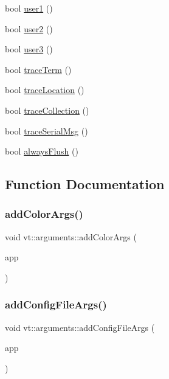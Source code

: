 \begin{DoxyCompactItemize}
$$\item 
bool \hyperlink{namespacevt_1_1arguments_afe229ddf0b473e54fac5ff6884b07ad0}{user1} ()
\item 
bool \hyperlink{namespacevt_1_1arguments_ae58fe1d056c863f7d8103e9c240d17f2}{user2} ()
\item 
bool \hyperlink{namespacevt_1_1arguments_afedf2c9949568b862ec5f8274ef6846b}{user3} ()
\item 
bool \hyperlink{namespacevt_1_1arguments_a60b229dc93c6fce2f24faa8237137a89}{trace\+Term} ()
\item 
bool \hyperlink{namespacevt_1_1arguments_aa49925bcb858fa5bb4779a8e5db3b368}{trace\+Location} ()
\item 
bool \hyperlink{namespacevt_1_1arguments_ae1a1115524b75b6cc64e19968ff16c09}{trace\+Collection} ()
\item 
bool \hyperlink{namespacevt_1_1arguments_ad239f3b085f99c963780dbcb0efd5668}{trace\+Serial\+Msg} ()
\item 
bool \hyperlink{namespacevt_1_1arguments_a6d542414122f93d1b7c6eaa04c3aadfb}{always\+Flush} ()
\end{DoxyCompactItemize}


\subsection{Function Documentation}
\mbox{\label{namespacevt_1_1arguments_ad20ec30a52a3746760ec7ce8eaaf9af4}} 
\subsubsection{\texorpdfstring{add\+Color\+Args()}{addColorArgs()}}
{\footnotesize\ttfamily void vt\+::arguments\+::add\+Color\+Args (\begin{DoxyParamCaption}\item[{C\+L\+I\+::\+App \&}]{app }\end{DoxyParamCaption})}

\mbox{\label{namespacevt_1_1arguments_a51a78d08f9d27671e3865515311af00a}} 
\subsubsection{\texorpdfstring{add\+Config\+File\+Args()}{addConfigFileArgs()}}
{\footnotesize\ttfamily void vt\+::arguments\+::add\+Config\+File\+Args (\begin{DoxyParamCaption}\item[{C\+L\+I\+::\+App \&}]{app }\end{DoxyParamCaption})}

